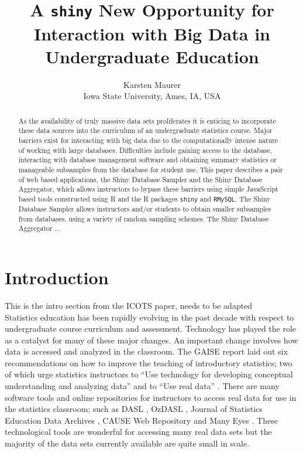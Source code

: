 \documentclass{article}\usepackage[]{graphicx}\usepackage[]{color}
\newcommand{\km}[1]{{\color{Orange} #1}}
\begin{document}
\tableofcontents
\newpage





\title{A \texttt{shiny} New Opportunity for Interaction with Big Data in Undergraduate Education}
\author{Karsten Maurer \\ Iowa State University, Ames, IA, USA}

\maketitle



 \begin{abstract}
As the availability of truly massive data sets proliferates it is enticing to incorporate these data sources into the curriculum of an undergraduate statistics course.  Major barriers exist for interacting with big data due to the computationally intense nature of working with large databases.  Difficulties include gaining access to the database, interacting with database management software and obtaining summary statistics or manageable subsamples from the database for student use.  This paper describes a pair of web based applications, the Shiny Database Sampler and the Shiny Database Aggregator, which allows instructors to bypass these barriers using simple JavaScript based tools constructed using R and the R packages \texttt{shiny} and \texttt{RMySQL}. The Shiny Database Sampler allows instructors and/or students to obtain smaller subsamples from databases, using a variety of random sampling schemes. The Shiny Database Aggregator ...
 \end{abstract}

\section{Introduction}

\km{This is the intro section from the ICOTS paper, needs to be adapted}\\

Statistics education has been rapidly evolving in the past decade with respect to undergraduate course curriculum and assessment. Technology has played the role as a catalyst for many of these major changes.  An important change involves how data is accessed and analyzed in the classroom.   The GAISE report laid out six recommendations on how to improve the teaching of introductory statistics; two of which urge statistics instructors to ``Use technology for developing conceptual understanding and analyzing data'' and to ``Use real data'' \citep{GAISEcollege}.   There are many software tools and online repositories for instructors to access real data for use in the statistics classroom; such as DASL \citep{DASL} , OzDASL \citep{OzDASL}, Journal of Statistics Education Data Archives \citep{JSErepo}, CAUSE Web Repository \citep{CAUSErepo}  and Many Eyes \citep{ManyEyes}.  These technological tools are wonderful for accessing many real data sets but the majority of the data sets currently available are quite small in scale.\\
\end{document}
